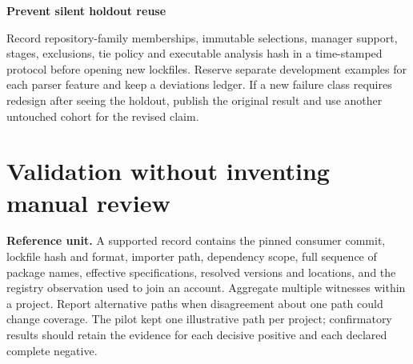 \documentclass[11pt,a4paper]{article}
\newcommand{\pg}[1]{\newpage\section{\color{ink}#1}}
\newcommand{\hd}[1]{\par\textbf{\color{accent}#1}\par\nopagebreak}
\begin{document}
\hd{Prevent silent holdout reuse}
Record repository-family memberships, immutable selections, manager support, stages, exclusions, tie policy and executable analysis hash in a time-stamped protocol before opening new lockfiles. Reserve separate development examples for each parser feature and keep a deviations ledger. If a new failure class requires redesign after seeing the holdout, publish the original result and use another untouched cohort for the revised claim.
\pg{Validation without inventing manual review}
\textbf{Reference unit.} A supported record contains the pinned consumer commit, lockfile hash and format, importer path, dependency scope, full sequence of package names, effective specifications, resolved versions and locations, and the registry observation used to join an account. Aggregate multiple witnesses within a project. Report alternative paths when disagreement about one path could change coverage. The pilot kept one illustrative path per project; confirmatory results should retain the evidence for each decisive positive and each declared complete negative.
\end{document}

